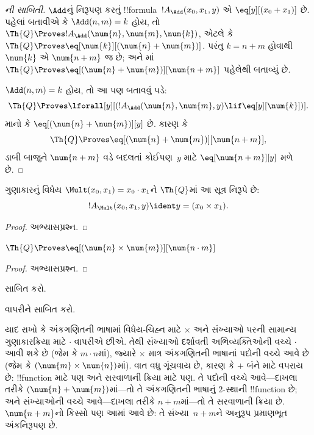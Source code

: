 \documentclass[../../../include/open-logic-section]{subfiles}
\begin{document}
\begin{proof}[ની સાબિતી]
$\Add$નું નિરૂપણ કરતું
!!{formula}~$!A_\Add(x_0, x_1, y)$
એ $\eq[y][(x_0 + x_1)]$ છે.
પહેલાં બતાવીએ કે
$\Add(n, m) = k$ હોય, તો
$\Th{Q} \Proves
!A_\Add(\num{n}, \num{m}, \num{k})$,
એટલે કે $\Th{Q} \Proves
\eq[\num{k}][(\num{n} + \num{m})]$.
પરંતુ $k = n + m$ હોવાથી
$\num{k}$ એ $\num{n+m}$ જ છે;
અને માં
$\Th{Q} \Proves \eq[(\num{n} +
  \num{m})][\num{n+m}]$
પહેલેથી બતાવ્યું છે.

$\Add(n, m) = k$ હોય, તો આ પણ
બતાવવું પડે:
\[
\Th{Q} \Proves \lforall[y][(!A_\Add(\num{n}, \num{m}, y) \lif
  \eq[y][\num{k}])].
\]
માનો કે
$\eq[(\num{n} + \num{m})][y]$ છે.
કારણ કે
\[
\Th{Q} \Proves \eq[(\num{n}+\num{m})][\num{n+m}],
\]
ડાબી બાજુને $\num{n+m}$ વડે
બદલતાં કોઈપણ~$y$ માટે
$\eq[\num{n+m}][y]$ મળે છે.
\end{proof}

\begin{prop}
ગુણાકારનું વિધેય
$\Mult(x_0, x_1) = x_0 \cdot x_1$ને
$\Th{Q}$માં આ સૂત્ર નિરૂપે છે:
\[
  !A_{\Mult}(x_0, x_1, y) \ident y = (x_0 \times x_1).
\]
\end{prop}

\begin{proof} અભ્યાસપ્રશ્ન. \end{proof}

\begin{lem}
$\Th{Q} \Proves \eq[(\num{n} \times \num{m})][\num{n \cdot m}]$
\end{lem}

\begin{proof} અભ્યાસપ્રશ્ન. \end{proof}

\begin{prob}
સાબિત કરો.
\end{prob}

\begin{prob}
વાપરીને
સાબિત કરો.
\end{prob}

\begin{explain}
યાદ રાખો કે અંકગણિતની
ભાષામાં વિધેય-ચિહ્ન માટે
$\times$ અને સંખ્યાઓ પરની
સામાન્ય ગુણાકારક્રિયા માટે
$\cdot$ વાપરીએ છીએ.
તેથી સંખ્યાઓ દર્શાવતી
અભિવ્યક્તિઓની વચ્ચે
$\cdot$ આવી શકે છે (જેમ કે
$m \cdot n$માં), જ્યારે
$\times$ માત્ર અંકગણિતની
ભાષાનાં પદોની વચ્ચે આવે છે
(જેમ કે $(\num{m} \times
  \num{n})$માં). વાત વધુ
ગૂંચવાય છે, કારણ કે $+$
બંને માટે વપરાય છે:
!!{function} માટે પણ અને
સરવાળાની ક્રિયા માટે પણ.
તે પદોની વચ્ચે આવે—દાખલા
તરીકે $(\num{n} + \num{m})$માં—તો
તે અંકગણિતની ભાષાનું $2$-સ્થાની
!!{function} છે; અને સંખ્યાઓની
વચ્ચે આવે—દાખલા તરીકે
$n+m$માં—તો તે સરવાળાની
ક્રિયા છે. $\num{n+m}$નો
કિસ્સો પણ આમાં આવે છે:
તે સંખ્યા~$n+m$ને અનુરૂપ
પ્રમાણભૂત અંકનિરૂપણ છે.
\end{explain}
\end{document}
